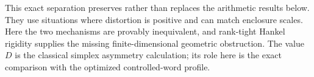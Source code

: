 This exact separation preserves rather than replaces the arithmetic
results below. They use situations where distortion is positive and
can match enclosure scales. Here the two mechanisms are provably
inequivalent, and rank-tight Hankel rigidity supplies the missing
finite-dimensional geometric obstruction. The value $D$ is the
classical simplex asymmetry calculation; its role here is the exact
comparison with the optimized controlled-word profile.
